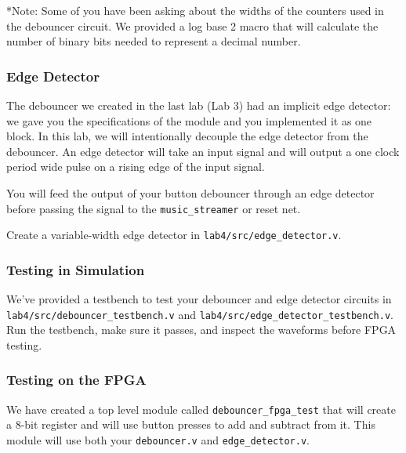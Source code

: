 \documentclass[11pt]{article}
\begin{document}

*Note: Some of you have been asking about the widths of the counters used in the debouncer circuit. We provided a log base 2 macro that will calculate the number of binary bits needed to represent a decimal number. 

\subsubsection{Edge Detector}

The debouncer we created in the last lab (Lab 3) had an implicit edge detector: we gave you the specifications of the module and you implemented it as one block. In this lab, we will intentionally decouple the edge detector from the debouncer. An edge detector will take an input signal and will output a one clock period wide pulse on a rising edge of the input signal.

You will feed the output of your button debouncer through an edge detector before passing the signal to the \verb|music_streamer| or reset net.

Create a variable-width edge detector in \verb|lab4/src/edge_detector.v|. 

\subsubsection{Testing in Simulation}

We've provided a testbench to test your debouncer and edge detector circuits in \verb|lab4/src/debouncer_testbench.v| and \verb|lab4/src/edge_detector_testbench.v|. Run the testbench, make sure it passes, and inspect the waveforms before FPGA testing.

\subsubsection{Testing on the FPGA}
We have created a top level module called \verb|debouncer_fpga_test| that will create a 8-bit register and will use button presses to add and subtract from it. This module will use both your \verb|debouncer.v| and \verb|edge_detector.v|.
\end{document}
